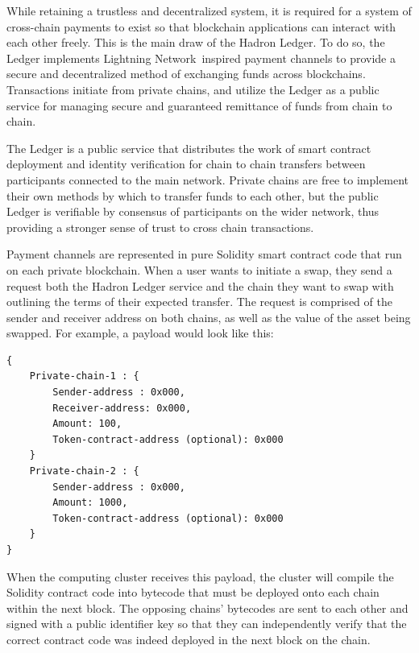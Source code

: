 \documentclass{%
	article}
\begin{document}
While retaining a trustless and decentralized system, it is required for a system of cross-chain payments to exist so that blockchain applications can interact with each other freely. This is the main draw of the Hadron Ledger. To do so, the Ledger implements Lightning Network\,\cite{lightning} inspired payment channels to provide a secure and decentralized method of exchanging funds across blockchains. Transactions initiate from private chains, and utilize the Ledger as a public service for managing secure and guaranteed remittance of funds from chain to chain.

The Ledger is a public service that distributes the work of smart contract deployment and identity verification for chain to chain transfers between participants connected to the main network. Private chains are free to implement their own methods by which to transfer funds to each other, but the public Ledger is verifiable by consensus of participants on the wider network, thus providing a stronger sense of trust to cross chain transactions.

Payment channels are represented in pure Solidity smart contract code that run on each private blockchain. When a user wants to initiate a swap, they send a request both the Hadron Ledger service and the chain they want to swap with outlining the terms of their expected transfer. The request is comprised of the sender and receiver address on both chains, as well as the value of the asset being swapped. For example, a payload would look like this:

\begin{lstlisting}
{
    Private-chain-1 : {
        Sender-address : 0x000,
        Receiver-address: 0x000,
        Amount: 100,
        Token-contract-address (optional): 0x000
    }
    Private-chain-2 : {
        Sender-address : 0x000,
        Amount: 1000,
        Token-contract-address (optional): 0x000
    }
}
\end{lstlisting}

When the computing cluster receives this payload, the cluster will compile the Solidity contract code into bytecode that must be deployed onto each chain within the next block. The opposing chains’ bytecodes are sent to each other and signed with a public identifier key so that they can independently verify that the correct contract code was indeed deployed in the next block on the chain.
\end{document}
